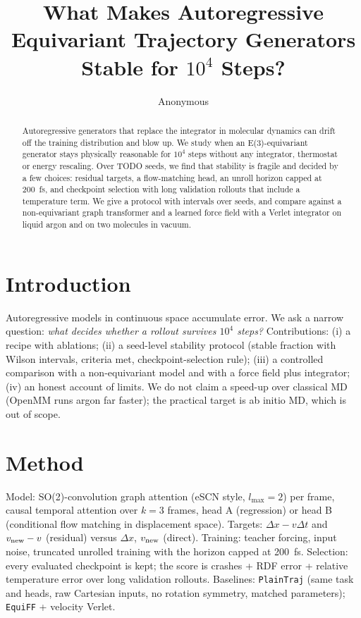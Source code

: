 \documentclass[11pt]{article}
\title{What Makes Autoregressive Equivariant Trajectory Generators Stable for $10^4$ Steps?}
\author{Anonymous}
\begin{document}
\maketitle

\begin{abstract}
Autoregressive generators that replace the integrator in molecular dynamics can drift off the training distribution and blow up.
We study when an E(3)-equivariant generator stays physically reasonable for $10^4$ steps without any integrator, thermostat or energy rescaling.
Over TODO seeds, we find that stability is fragile and decided by a few choices: residual targets, a flow-matching head, an unroll horizon capped at 200~fs,
and checkpoint selection with long validation rollouts that include a temperature term.
We give a protocol with intervals over seeds, and compare against a non-equivariant graph transformer and a learned force field with a Verlet integrator
on liquid argon and on two molecules in vacuum.
\end{abstract}

\section{Introduction}
Autoregressive models in continuous space accumulate error. We ask a narrow question: \emph{what decides whether a rollout survives $10^4$ steps?}
Contributions: (i) a recipe with ablations; (ii) a seed-level stability protocol (stable fraction with Wilson intervals, criteria met, checkpoint-selection rule);
(iii) a controlled comparison with a non-equivariant model and with a force field plus integrator; (iv) an honest account of limits.
We do not claim a speed-up over classical MD (OpenMM runs argon far faster); the practical target is ab initio MD, which is out of scope.

\section{Method}
Model: SO(2)-convolution graph attention (eSCN style, $l_{\max}=2$) per frame, causal temporal attention over $k=3$ frames,
head A (regression) or head B (conditional flow matching in displacement space). Targets: $\Delta x - v\Delta t$ and $v_{\rm new}-v$ (residual) versus $\Delta x$, $v_{\rm new}$ (direct).
Training: teacher forcing, input noise, truncated unrolled training with the horizon capped at 200~fs.
Selection: every evaluated checkpoint is kept; the score is crashes + RDF error + relative temperature error over long validation rollouts.
Baselines: \texttt{PlainTraj} (same task and heads, raw Cartesian inputs, no rotation symmetry, matched parameters); \texttt{EquiFF} + velocity Verlet.
\end{document}
